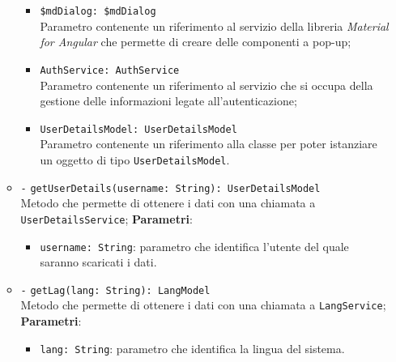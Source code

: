 \begin{itemize}
\begin{itemize}
\begin{itemize}
					\item \texttt{\$mdDialog: \$mdDialog} \\
					Parametro contenente un riferimento al servizio della libreria \textit{Material for Angular} che permette di creare delle componenti a pop-up;
					\item \texttt{AuthService: AuthService} \\
					Parametro contenente un riferimento al servizio che si occupa della gestione delle informazioni legate all’autenticazione;
					\item \texttt{UserDetailsModel: UserDetailsModel} \\
					Parametro contenente un riferimento alla classe per poter istanziare un oggetto di tipo \texttt{UserDetailsModel}.
				\end{itemize}
				\item \texttt{-} \texttt{getUserDetails(username: String): UserDetailsModel} \\ Metodo che permette di ottenere i dati con una chiamata a \texttt{UserDetailsService};
				\textbf{Parametri}:
				\begin{itemize}
					\item \texttt{username: String}: parametro che identifica l'utente del quale saranno scaricati i dati.
				\end{itemize}
				\item \texttt{-} \texttt{getLag(lang: String): LangModel} \\ Metodo che permette di ottenere i dati con una chiamata a \texttt{LangService}; \\
				\textbf{Parametri}:
				\begin{itemize}
					\item \texttt{lang: String}: parametro che identifica la lingua del sistema.
				\end{itemize}
			\end{itemize}
		\end{itemize}
		